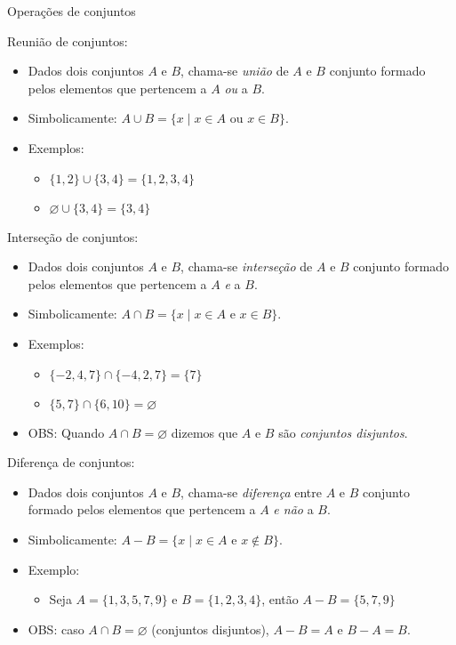 \documentclass[14pt, aspectratio=169]{beamer}
\begin{document}
\begin{frame}[allowframebreaks]{Operações de conjuntos}

Reunião de conjuntos:

 \begin{itemize}
    \item Dados dois conjuntos $A$ e $B$, chama-se \emph{união} de $A$ e $B$ conjunto formado pelos elementos que pertencem a $A$ \emph{ou} a $B$.
    \item Simbolicamente: $A \cup B = \{x \mid x \in A \text{ ou } x \in B \}$.
    \item Exemplos: 
        \begin{itemize}
            \item $\{ 1, 2 \} \cup \{ 3, 4 \} = \{ 1, 2, 3, 4 \}$
            \item $\varnothing \cup \{ 3, 4 \} = \{ 3, 4 \}$
        \end{itemize}
\end{itemize}

\vspace{5.0cm}

Interseção de conjuntos:

\begin{itemize}
    \item Dados dois conjuntos $A$ e $B$, chama-se \emph{interseção} de $A$ e $B$ conjunto formado pelos elementos que pertencem a $A$ \emph{e} a $B$.
    \item Simbolicamente: $A \cap B = \{x \mid x \in A \text{ e } x \in B \}$.
    \item Exemplos: 
        \begin{itemize}
            \item $\{ -2, 4, 7 \} \cap \{-4, 2, 7 \} = \{ 7 \}$
            \item $\{ 5, 7 \} \cap \{ 6, 10 \} = \varnothing$
        \end{itemize}
    \item OBS: Quando $A \cap B = \varnothing $ dizemos que $A$ e $B$ são \emph{conjuntos disjuntos}.
    
\end{itemize}

\vspace{5.0cm}

Diferença de conjuntos:

 \begin{itemize}
    \item Dados dois conjuntos $A$ e $B$, chama-se \emph{diferença} entre $A$ e $B$ conjunto formado pelos elementos que pertencem a $A$ \emph{e não} a $B$.
    \item Simbolicamente: $A - B = \{x \mid x \in A \text{ e } x \notin B \}$.
    \item Exemplo: 
        \begin{itemize}
            \item Seja $A = \{ 1, 3, 5, 7, 9 \}$ e $B = \{ 1, 2, 3, 4 \}$, então $A - B = \{ 5, 7, 9 \}$
        \end{itemize}
    \item OBS: caso $A \cap B = \varnothing$ (conjuntos disjuntos), $A - B = A$ e $B - A = B$.
\end{itemize}


\end{frame}
\end{document}

